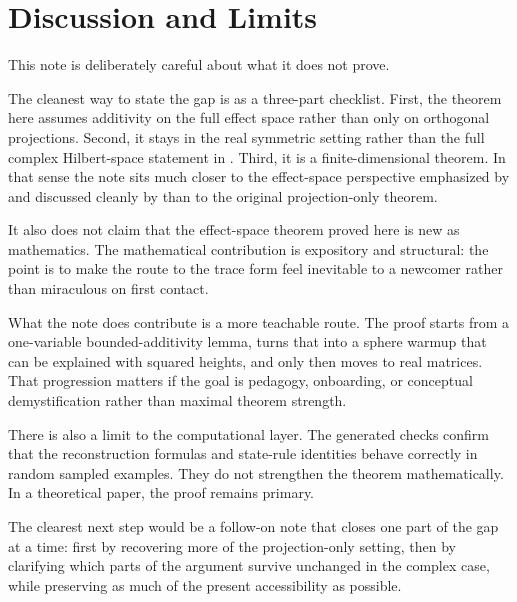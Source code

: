 \section{Discussion and Limits}

This note is deliberately careful about what it does not prove.

The cleanest way to state the gap is as a three-part checklist. First, the theorem here assumes additivity on the full effect space rather than only on orthogonal projections. Second, it stays in the real symmetric setting rather than the full complex Hilbert-space statement in \citet{gleason1957}. Third, it is a finite-dimensional theorem. In that sense the note sits much closer to the effect-space perspective emphasized by \citet{busch2003} and discussed cleanly by \citet{wright2019} than to the original projection-only theorem.

It also does not claim that the effect-space theorem proved here is new as mathematics. The mathematical contribution is expository and structural: the point is to make the route to the trace form feel inevitable to a newcomer rather than miraculous on first contact.

What the note does contribute is a more teachable route. The proof starts from a one-variable bounded-additivity lemma, turns that into a sphere warmup that can be explained with squared heights, and only then moves to real matrices. That progression matters if the goal is pedagogy, onboarding, or conceptual demystification rather than maximal theorem strength.

There is also a limit to the computational layer. The generated checks confirm that the reconstruction formulas and state-rule identities behave correctly in random sampled examples. They do not strengthen the theorem mathematically. In a theoretical paper, the proof remains primary.

The clearest next step would be a follow-on note that closes one part of the gap at a time: first by recovering more of the projection-only setting, then by clarifying which parts of the argument survive unchanged in the complex case, while preserving as much of the present accessibility as possible.
